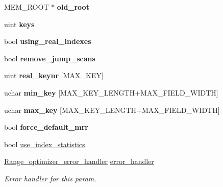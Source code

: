 \begin{DoxyCompactItemize}
M\+E\+M\+\_\+\+R\+O\+OT $\ast$ {\bfseries old\+\_\+root}
\item 
\mbox{\label{classRANGE__OPT__PARAM_a113313062c2189bea6748f2a0c0c71b5}} 
uint {\bfseries keys}
\item 
\mbox{\label{classRANGE__OPT__PARAM_ac3038f87a0c6f75ca36a5e337aa839fa}} 
bool {\bfseries using\+\_\+real\+\_\+indexes}
\item 
\mbox{\label{classRANGE__OPT__PARAM_a0b331ed1e072ee1491f634aff5f2d486}} 
bool {\bfseries remove\+\_\+jump\+\_\+scans}
\item 
\mbox{\label{classRANGE__OPT__PARAM_a1316d0540ed1eaddb327aa33a0d8ccdd}} 
uint {\bfseries real\+\_\+keynr} \mbox{[}M\+A\+X\+\_\+\+K\+EY\mbox{]}
\item 
\mbox{\label{classRANGE__OPT__PARAM_af0295e577fe361ef4e8894c30873055b}} 
uchar {\bfseries min\+\_\+key} \mbox{[}M\+A\+X\+\_\+\+K\+E\+Y\+\_\+\+L\+E\+N\+G\+TH+M\+A\+X\+\_\+\+F\+I\+E\+L\+D\+\_\+\+W\+I\+D\+TH\mbox{]}
\item 
\mbox{\label{classRANGE__OPT__PARAM_af10fb7b1d25a7942042a75f171452864}} 
uchar {\bfseries max\+\_\+key} \mbox{[}M\+A\+X\+\_\+\+K\+E\+Y\+\_\+\+L\+E\+N\+G\+TH+M\+A\+X\+\_\+\+F\+I\+E\+L\+D\+\_\+\+W\+I\+D\+TH\mbox{]}
\item 
\mbox{\label{classRANGE__OPT__PARAM_a4fec012164262de26f1240a1440030b3}} 
bool {\bfseries force\+\_\+default\+\_\+mrr}
\item 
bool \mbox{\hyperlink{classRANGE__OPT__PARAM_a4849251021b18cc47419b75aa454eda9}{use\+\_\+index\+\_\+statistics}}
\item 
\mbox{\label{classRANGE__OPT__PARAM_a544c2b898555c72fbc276874afcaa0b7}} 
\mbox{\hyperlink{classRange__optimizer__error__handler}{Range\+\_\+optimizer\+\_\+error\+\_\+handler}} \mbox{\hyperlink{classRANGE__OPT__PARAM_a544c2b898555c72fbc276874afcaa0b7}{error\+\_\+handler}}
\begin{DoxyCompactList}\small\item\em Error handler for this param. \end{DoxyCompactList}\end{DoxyCompactItemize}


